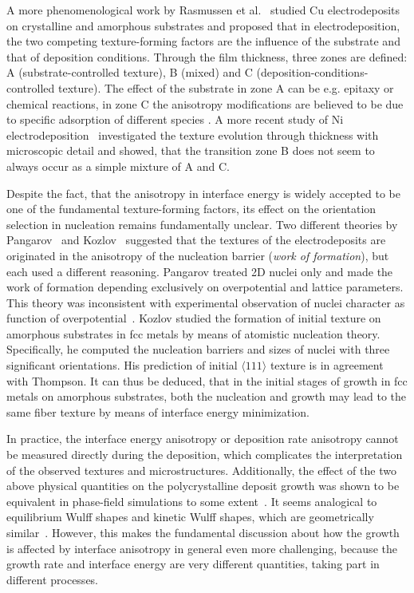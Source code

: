 A more phenomenological work by Rasmussen et al.~\cite{Rasmussen2001} studied Cu electrodeposits on crystalline and amorphous substrates and proposed that in electrodeposition, the two competing texture-forming factors are the influence of the substrate and that of deposition conditions. Through the film thickness, three zones are defined: A (substrate-controlled texture), B (mixed) and C (deposition-conditions-controlled texture). The effect of the substrate in zone A can be e.g. epitaxy or chemical reactions, in zone C the anisotropy modifications are believed to be due to specific adsorption of different species \cite{Amblard1979,BergenstofNielsen1997}. A more recent study of Ni electrodeposition~\cite{Alimadadi2016} investigated the texture evolution through thickness with microscopic detail and showed, that the transition zone B does not seem to always occur as a simple mixture of A and C.

Despite the fact, that the anisotropy in interface energy is widely accepted to be one of the fundamental texture-forming factors, its effect on the orientation selection in nucleation remains fundamentally unclear. Two different theories by Pangarov~\cite{Pangarov1962,Pangarov1964} and Kozlov~\cite{Kozlov2003} suggested that the textures of the electrodeposits are originated in the anisotropy of the nucleation barrier (\textit{work of formation}), but each used a different reasoning. Pangarov treated 2D nuclei only and made the work of formation depending exclusively on overpotential and lattice parameters. This theory was inconsistent with experimental observation of nuclei character as function of overpotential~\cite{Bulatov2014}. Kozlov studied the formation of initial texture on amorphous substrates in fcc metals by means of atomistic nucleation theory. Specifically, he computed the nucleation barriers and sizes of nuclei with three significant orientations. His prediction of initial $\langle111\rangle$ texture is in agreement with Thompson. It can thus be deduced, that in the initial stages of growth in fcc metals on amorphous substrates, both the nucleation and growth may lead to the same fiber texture by means of interface energy minimization. 

In practice, the interface energy anisotropy or deposition rate anisotropy cannot be measured directly during the deposition, which complicates the interpretation of the observed textures and microstructures. Additionally, the effect of the two above physical quantities on the polycrystalline deposit growth was shown to be equivalent in phase-field simulations to some extent~\cite{Wendler2011}. It seems analogical to equilibrium Wulff shapes and kinetic Wulff shapes, which are geometrically similar~\cite{Kobayashi2001}. However, this makes the fundamental discussion about how the growth is affected by interface anisotropy in general even more challenging, because the growth rate and interface energy are very different quantities, taking part in different processes. 

